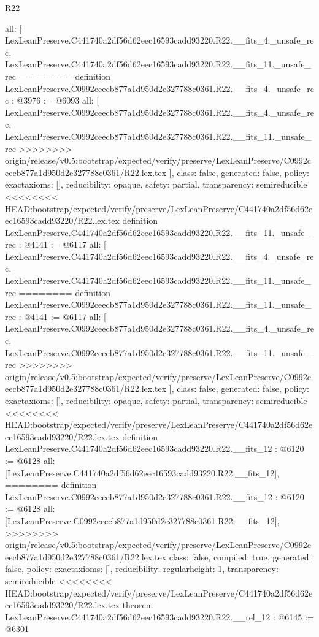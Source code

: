 \begin{lexlean}{R22}
\begin{coremodule}
{{{{{{{{{{{{{{{{{{{{{{{{{{  all: [
    LexLeanPreserve.C441740a2df56d62eec16593cadd93220.R22.__fits_4._unsafe_rec,
    LexLeanPreserve.C441740a2df56d62eec16593cadd93220.R22.__fits_11._unsafe_rec
========
definition LexLeanPreserve.C0992ceecb877a1d950d2e327788c0361.R22.__fits_4._unsafe_rec : @3976 := @6093 {
  all: [
    LexLeanPreserve.C0992ceecb877a1d950d2e327788c0361.R22.__fits_4._unsafe_rec,
    LexLeanPreserve.C0992ceecb877a1d950d2e327788c0361.R22.__fits_11._unsafe_rec
>>>>>>>> origin/release/v0.5:bootstrap/expected/verify/preserve/LexLeanPreserve/C0992ceecb877a1d950d2e327788c0361/R22.lex.tex
  ],
  class: false,
  generated: false,
  policy: exact{axioms: []},
  reducibility: opaque{},
  safety: partial,
  transparency: semireducible
}
<<<<<<<< HEAD:bootstrap/expected/verify/preserve/LexLeanPreserve/C441740a2df56d62eec16593cadd93220/R22.lex.tex
definition LexLeanPreserve.C441740a2df56d62eec16593cadd93220.R22.__fits_11._unsafe_rec : @4141 := @6117 {
  all: [
    LexLeanPreserve.C441740a2df56d62eec16593cadd93220.R22.__fits_4._unsafe_rec,
    LexLeanPreserve.C441740a2df56d62eec16593cadd93220.R22.__fits_11._unsafe_rec
========
definition LexLeanPreserve.C0992ceecb877a1d950d2e327788c0361.R22.__fits_11._unsafe_rec : @4141 := @6117 {
  all: [
    LexLeanPreserve.C0992ceecb877a1d950d2e327788c0361.R22.__fits_4._unsafe_rec,
    LexLeanPreserve.C0992ceecb877a1d950d2e327788c0361.R22.__fits_11._unsafe_rec
>>>>>>>> origin/release/v0.5:bootstrap/expected/verify/preserve/LexLeanPreserve/C0992ceecb877a1d950d2e327788c0361/R22.lex.tex
  ],
  class: false,
  generated: false,
  policy: exact{axioms: []},
  reducibility: opaque{},
  safety: partial,
  transparency: semireducible
}
<<<<<<<< HEAD:bootstrap/expected/verify/preserve/LexLeanPreserve/C441740a2df56d62eec16593cadd93220/R22.lex.tex
definition LexLeanPreserve.C441740a2df56d62eec16593cadd93220.R22.__fits_12 : @6120 := @6128 {
  all: [LexLeanPreserve.C441740a2df56d62eec16593cadd93220.R22.__fits_12],
========
definition LexLeanPreserve.C0992ceecb877a1d950d2e327788c0361.R22.__fits_12 : @6120 := @6128 {
  all: [LexLeanPreserve.C0992ceecb877a1d950d2e327788c0361.R22.__fits_12],
>>>>>>>> origin/release/v0.5:bootstrap/expected/verify/preserve/LexLeanPreserve/C0992ceecb877a1d950d2e327788c0361/R22.lex.tex
  class: false,
  compiled: true,
  generated: false,
  policy: exact{axioms: []},
  reducibility: regular{height: 1},
  transparency: semireducible
}
<<<<<<<< HEAD:bootstrap/expected/verify/preserve/LexLeanPreserve/C441740a2df56d62eec16593cadd93220/R22.lex.tex
theorem LexLeanPreserve.C441740a2df56d62eec16593cadd93220.R22.__rel_12 : @6145 := @6301 {
}}}}}}}}}}}}}}}}}}}}}}}}}}}}}
\end{coremodule}
\end{lexlean}
